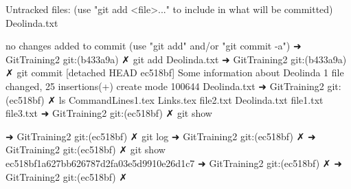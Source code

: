 Untracked files:
  (use "git add <file>..." to include in what will be committed)
	Deolinda.txt

no changes added to commit (use "git add" and/or "git commit -a")
➜  GitTraining2 git:(b433a9a) ✗ git add Deolinda.txt                     
➜  GitTraining2 git:(b433a9a) ✗ git commit
[detached HEAD ec518bf] Some information about Deolinda
 1 file changed, 25 insertions(+)
 create mode 100644 Deolinda.txt
➜  GitTraining2 git:(ec518bf) ✗ ls           
CommandLines1.tex Links.tex         file2.txt
Deolinda.txt      file1.txt         file3.txt
➜  GitTraining2 git:(ec518bf) ✗ git show














➜  GitTraining2 git:(ec518bf) ✗ git log
➜  GitTraining2 git:(ec518bf) ✗ 
➜  GitTraining2 git:(ec518bf) ✗ git show ec518bf1a627bb626787d2fa03e5d9910e26d1c7
➜  GitTraining2 git:(ec518bf) ✗ 
➜  GitTraining2 git:(ec518bf) ✗ 


